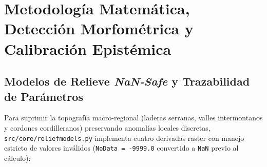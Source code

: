 \documentclass[11pt,a4paper]{article}
\DeclareRobustCommand{\_}{\ifmmode\mbox{\textunderscore}\else\textunderscore\allowbreak\fi}
\begin{document}
\FloatBarrier
\section{Metodolog\'ia Matem\'atica, Detecci\'on Morfom\'etrica y Calibraci\'on Epist\'emica}

\subsection{Modelos de Relieve \emph{NaN-Safe} y Trazabilidad de Par\'ametros}

Para suprimir la topograf\'ia macro-regional (laderas serranas, valles intermontanos y cordones cordilleranos) preservando anomal\'ias locales discretas, \texttt{src/core/relief\_models.py} implementa cuatro derivadas raster con manejo estricto de valores inv\'alidos (\texttt{NoData = -9999.0} convertido a \texttt{NaN} previo al c\'alculo):
\end{document}
